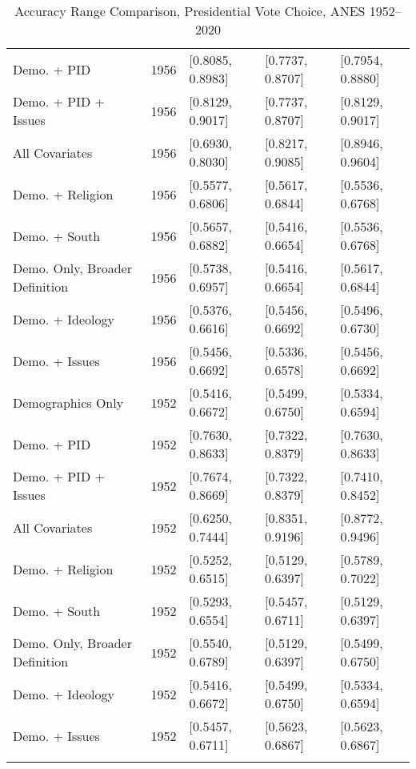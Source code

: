 \begin{longtable}{lrlll}
  Demo. + PID & 1956 & [0.8085, 0.8983] & [0.7737, 0.8707] & [0.7954, 0.8880] \\ 
  Demo. + PID + Issues & 1956 & [0.8129, 0.9017] & [0.7737, 0.8707] & [0.8129, 0.9017] \\ 
  All Covariates & 1956 & [0.6930, 0.8030] & [0.8217, 0.9085] & [0.8946, 0.9604] \\ 
  Demo. + Religion & 1956 & [0.5577, 0.6806] & [0.5617, 0.6844] & [0.5536, 0.6768] \\ 
  Demo. + South & 1956 & [0.5657, 0.6882] & [0.5416, 0.6654] & [0.5536, 0.6768] \\ 
  Demo. Only, Broader Definition & 1956 & [0.5738, 0.6957] & [0.5416, 0.6654] & [0.5617, 0.6844] \\ 
  Demo. + Ideology & 1956 & [0.5376, 0.6616] & [0.5456, 0.6692] & [0.5496, 0.6730] \\ 
  Demo. + Issues & 1956 & [0.5456, 0.6692] & [0.5336, 0.6578] & [0.5456, 0.6692] \\ 
  Demographics Only & 1952 & [0.5416, 0.6672] & [0.5499, 0.6750] & [0.5334, 0.6594] \\ 
  Demo. + PID & 1952 & [0.7630, 0.8633] & [0.7322, 0.8379] & [0.7630, 0.8633] \\ 
  Demo. + PID + Issues & 1952 & [0.7674, 0.8669] & [0.7322, 0.8379] & [0.7410, 0.8452] \\ 
  All Covariates & 1952 & [0.6250, 0.7444] & [0.8351, 0.9196] & [0.8772, 0.9496] \\ 
  Demo. + Religion & 1952 & [0.5252, 0.6515] & [0.5129, 0.6397] & [0.5789, 0.7022] \\ 
  Demo. + South & 1952 & [0.5293, 0.6554] & [0.5457, 0.6711] & [0.5129, 0.6397] \\ 
  Demo. Only, Broader Definition & 1952 & [0.5540, 0.6789] & [0.5129, 0.6397] & [0.5499, 0.6750] \\ 
  Demo. + Ideology & 1952 & [0.5416, 0.6672] & [0.5499, 0.6750] & [0.5334, 0.6594] \\ 
  Demo. + Issues & 1952 & [0.5457, 0.6711] & [0.5623, 0.6867] & [0.5623, 0.6867] \\ 
   \bottomrule
\caption{Accuracy Range Comparison, Presidential Vote Choice, ANES 1952--2020} 
\label{tab:ANES_prezvote_accuracy}
\end{longtable}
